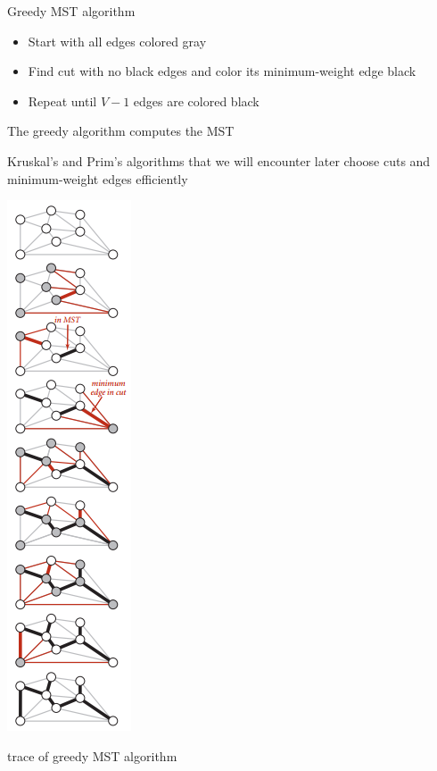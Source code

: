 \documentclass[8pt,a4paper,compress]{beamer}
\begin{document}
\begin{frame}[fragile]
\begin{minipage}{200pt}
Greedy MST algorithm
\begin{itemize}
\item Start with all edges colored gray

\item Find cut with no black edges and color its minimum-weight edge black

\item Repeat until $V - 1$ edges are colored black
\end{itemize}

\bigskip

The greedy algorithm computes the MST

\bigskip

Kruskal's and Prim's algorithms that we will encounter later choose cuts and minimum-weight edges efficiently
\end{minipage}%
\begin{minipage}{100pt}
\begin{center}
\includegraphics[scale=0.4]{./figures/mst3.png}

\smallskip

\tiny trace of greedy MST algorithm
\end{center}
\end{minipage}
\end{frame}
\end{document}
